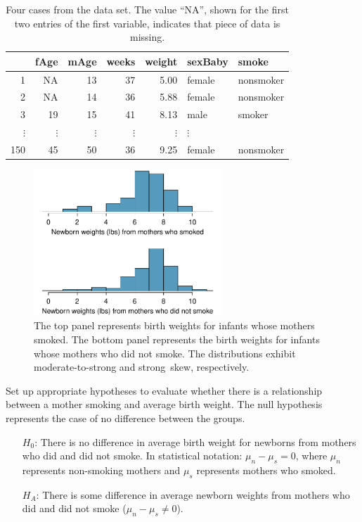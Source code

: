 {\begin{table}[h]
\centering
\begin{tabular}{rrrrrll}
  \hline
 & fAge & mAge & weeks & weight & sexBaby & smoke \\ 
  \hline
1 & NA & 13 &  37 & 5.00 & female & nonsmoker \\ 
  2 & NA & 14 &  36 & 5.88 & female & nonsmoker \\ 
  3 & 19 & 15 &  41 & 8.13 & male & smoker \\ 
  $\vdots$ &   $\vdots$ &   $\vdots$ &   $\vdots$ &   $\vdots$ &   $\vdots$ \\
  150 & 45 & 50 &  36 & 9.25 & female & nonsmoker \\ 
   \hline
\end{tabular}
\caption{Four cases from the  data set. The value ``NA'', shown for the first two entries of the first variable, indicates that piece of data is missing.}
\label{babySmokeDF}
\end{table}

\begin{figure}[hhh]
\centering
\includegraphics[width=0.63\textwidth]{ch_inference_for_means/figures/babySmokePlotOfTwoGroupsToExamineSkew/babySmokePlotOfTwoGroupsToExamineSkew}
\caption{The top panel represents birth weights for infants whose mothers smoked. The bottom panel represents the birth weights for infants whose mothers who did not smoke. The distributions exhibit moderate-to-strong and strong~skew, respectively.}
\label{babySmokePlotOfTwoGroupsToExamineSkew}
\end{figure}

\begin{example}{Set up appropriate hypotheses to evaluate whether there is a relationship between a mother smoking and average birth weight.}\label{babySmokeHTForWeight}
The null hypothesis represents the case of no difference between the groups.
\begin{itemize}
\setlength{\itemsep}{0mm}
\item[$H_0$:] There is no difference in average birth weight for newborns from mothers who did and did not smoke. In statistical notation: $\mu_{n} - \mu_{s} = 0$, where $\mu_{n}$ represents non-smoking mothers and $\mu_s$ represents mothers who smoked.
\item[$H_A$:] There is some difference in average newborn weights from mothers who did and did not smoke ($\mu_{n} - \mu_{s} \neq 0$).
\end{itemize}
\end{example}

}
